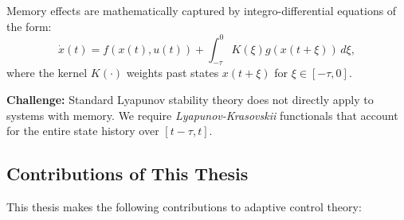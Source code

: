 Memory effects are mathematically captured by integro-differential equations of the form:
\begin{equation}
    \dot{x}(t) = f(x(t), u(t)) + \int_{-\tau}^0 K(\xi) g(x(t+\xi)) \, d\xi,
\end{equation}
where the kernel $K(\cdot)$ weights past states $x(t+\xi)$ for $\xi \in [-\tau, 0]$.

\textbf{Challenge:} Standard Lyapunov stability theory does not directly apply to systems with memory. We require \textit{Lyapunov-Krasovskii} functionals that account for the entire state history over $[t-\tau, t]$.

\subsection{Contributions of This Thesis}

This thesis makes the following contributions to adaptive control theory:

